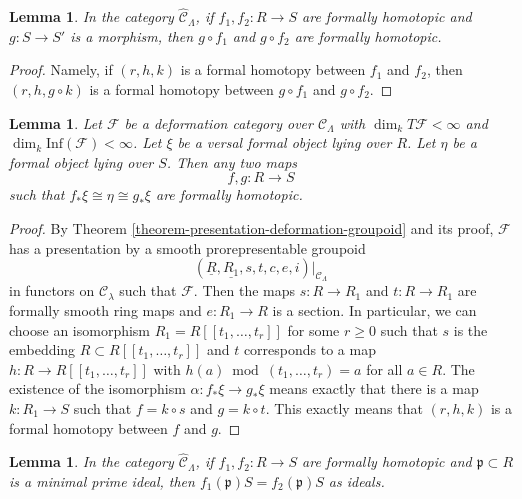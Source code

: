 \documentclass{stacks-project}
\theoremstyle{plain}
\newtheorem{lemma}[subsection]{Lemma}
\theoremstyle{definition}
\theoremstyle{remark}
\numberwithin{equation}{subsection}
\begin{document}
\begin{lemma}
\label{lemma-composition-homotopic}
In the category $\widehat{\mathcal{C}}_\Lambda$, if $f_1, f_2 : R \to S$
are formally homotopic and $g : S \to S'$ is a morphism, then
$g \circ f_1$ and $g \circ f_2$ are formally homotopic.
\end{lemma}

\begin{proof}
Namely, if $(r, h, k)$ is a formal homotopy between $f_1$ and $f_2$, then
$(r, h, g \circ k)$ is a formal homotopy between $g \circ f_1$ and
$g \circ f_2$.
\end{proof}

\begin{lemma}
\label{lemma-versal-unique-up-to-homotopy}
Let $\mathcal{F}$ be a deformation category over $\mathcal{C}_\Lambda$
with $\dim_k T\mathcal{F} < \infty$ and
$\dim_k \text{Inf}(\mathcal{F}) < \infty$. Let $\xi$ be a versal formal
object lying over $R$. Let $\eta$ be a formal object lying over $S$.
Then any two maps
$$
f, g : R \to S
$$
such that $f_*\xi \cong \eta \cong g_*\xi$ are formally homotopic.
\end{lemma}

\begin{proof}
By Theorem \ref{theorem-presentation-deformation-groupoid}
and its proof, $\mathcal{F}$ has a presentation by
a smooth prorepresentable groupoid
$$
(\underline{R}, \underline{R_1}, s, t, c, e, i)|_{\mathcal{C}_\Lambda}
$$
in functors on $\mathcal{C}_\lambda$ such that $\mathcal{F}$.
Then the maps $s : R \to R_1$ and $t : R \to R_1$ are formally
smooth ring maps and $e : R_1 \to R$ is a section.
In particular, we can choose an isomorphism
$R_1 = R[[t_1, \ldots, t_r]]$ for some $r \geq 0$ such
that $s$ is the embedding $R \subset R[[t_1, \ldots, t_r]]$
and $t$ corresponds to a map $h : R \to R[[t_1, \ldots, t_r]]$
with $h(a) \bmod (t_1, \ldots, t_r) = a$ for all $a \in R$.
The existence of the isomorphism $\alpha : f_*\xi \to g_*\xi$
means exactly that there is a map $k : R_1 \to S$
such that $f = k \circ s$ and $g = k \circ t$.
This exactly means that $(r, h, k)$ is a formal homotopy between
$f$ and $g$.
\end{proof}

\begin{lemma}
\label{lemma-homotopic-minimal-prime}
In the category $\widehat{\mathcal{C}}_\Lambda$, if $f_1, f_2 : R \to S$
are formally homotopic and $\mathfrak p \subset R$ is a minimal
prime ideal, then $f_1(\mathfrak p)S = f_2(\mathfrak p)S$ as ideals.
\end{lemma}
\end{document}
